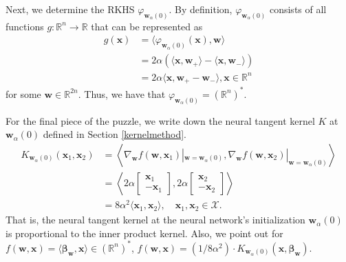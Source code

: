 \documentclass{article}
\begin{document}
Next, we determine the RKHS $\varphi_{\boldsymbol{w}_{\alpha}(0)}$. By definition, $\varphi_{\boldsymbol{w}_{\alpha}(0)}$ consists of all functions $g: \mathbb{R}^n \rightarrow \mathbb{R}$ that can be represented as 
\begin{align*}
    g(\boldsymbol{x}) &= \langle \varphi_{\boldsymbol{w}_{\alpha}(0)}(\boldsymbol{x}), \boldsymbol{w} \rangle\\
    &= 2\alpha (\langle \boldsymbol{x}, \boldsymbol{w}_+ \rangle  - \langle \boldsymbol{x}, \boldsymbol{w}_-\rangle)\\
    &= 2\alpha \langle \boldsymbol{x}, \boldsymbol{w}_+ - \boldsymbol{w}_- \rangle, \boldsymbol{x} \in \mathbb{R}^n
\end{align*}
for some $\boldsymbol{w} \in \mathbb{R}^{2n}$. Thus, we have that $\varphi_{\boldsymbol{w}_{\alpha}(0)} = (\mathbb{R}^n)^*$.

For the final piece of the puzzle, we write down the neural tangent kernel $K$ at $\boldsymbol{w}_{\alpha}(0)$ defined in Section \ref{kernelmethod}.
\begin{align*}
K_{\boldsymbol{w}_{\alpha}(0)}(\boldsymbol{x}_1, \boldsymbol{x}_2) &= \left\langle \nabla_{\boldsymbol{w}}f(\boldsymbol{w}, \boldsymbol{x}_1)|_{\boldsymbol{w} = \boldsymbol{w}_{\alpha}(0)}, \nabla_{\boldsymbol{w}}f(\boldsymbol{w}, \boldsymbol{x}_2)|_{\boldsymbol{w} = \boldsymbol{w}_{\alpha}(0)} \right\rangle\\
&= \left\langle 2\alpha 
    \begin{bmatrix}
        \boldsymbol{x}_1\\
        -\boldsymbol{x}_1
    \end{bmatrix}, 2\alpha 
    \begin{bmatrix}
        \boldsymbol{x}_2\\
        -\boldsymbol{x}_2
    \end{bmatrix} \right\rangle\\
&= 8\alpha^2 \langle \boldsymbol{x}_1, \boldsymbol{x}_2 \rangle, \quad \boldsymbol{x}_1, \boldsymbol{x}_2 \in \mathcal{X}.
\end{align*}
That is, the neural tangent kernel at the neural network's initialization $\boldsymbol{w}_{\alpha}(0)$ is proportional to the inner product kernel. Also, we point out for $f(\boldsymbol{w}, \boldsymbol{x}) = \langle \boldsymbol{\beta}_{\boldsymbol{w}}, \boldsymbol{x} \rangle \in (\mathbb{R}^n)^*$, $f(\boldsymbol{w}, \boldsymbol{x}) =  (1/8\alpha^2)\cdot K_{\boldsymbol{w}_{\alpha}(0)}(\boldsymbol{x},\boldsymbol{\beta}_{\boldsymbol{w}})$.
\end{document}
